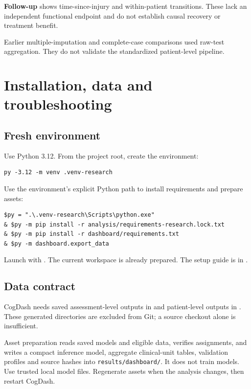 \documentclass[11pt,a4paper]{article}
\newcommand{\note}[1]{\par\smallskip\colorbox{pale}{\parbox{\dimexpr\linewidth-2\fboxsep\relax}{\vspace{0.4em}#1\vspace{0.4em}}}\par\smallskip}
\newcommand{\page}[1]{\clearpage\section{#1}}
\begin{document}
\textbf{Follow-up} shows time-since-injury and within-patient transitions. These lack an independent functional endpoint and do not establish causal recovery or treatment benefit.

\note{Earlier multiple-imputation and complete-case comparisons used raw-test aggregation. They do not validate the standardized patient-level pipeline.}

\page{Installation, data and troubleshooting}
\subsection*{Fresh environment}
Use Python 3.12. From the project root, create the environment:
\begin{verbatim}
py -3.12 -m venv .venv-research
\end{verbatim}
Use the environment's explicit Python path to install requirements and prepare assets:
{\small\begin{verbatim}
$py = ".\.venv-research\Scripts\python.exe"
& $py -m pip install -r analysis/requirements-research.lock.txt
& $py -m pip install -r dashboard/requirements.txt
& $py -m dashboard.export_data
\end{verbatim}}
Launch with . The current workspace is already prepared. The setup guide is in .

\subsection*{Data contract}
CogDash needs saved assessment-level outputs in  and patient-level outputs in . These generated directories are excluded from Git; a source checkout alone is insufficient.

Asset preparation reads saved models and eligible data, verifies assignments, and writes a compact inference model, aggregate clinical-unit tables, validation profiles and source hashes into \texttt{results/dashboard/}. It does not train models. Use trusted local model files. Regenerate assets when the analysis changes, then restart CogDash.
\end{document}
